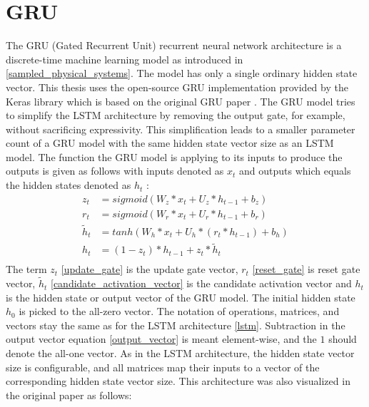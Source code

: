 \documentclass[draft,final]{vutinfth} %
\begin{document}
\section{GRU} \label{gru}
The GRU (Gated Recurrent Unit) recurrent neural network architecture is a discrete-time machine learning model as introduced in \ref{sampled_physical_systems}.
The model has only a single ordinary hidden state vector.
This thesis uses the open-source GRU implementation provided by the Keras library \cite{Keras} which is based on the original GRU paper \cite{GRU}.
The GRU model tries to simplify the LSTM architecture by removing the output gate, for example, without sacrificing expressivity.
This simplification leads to a smaller parameter count of a GRU model with the same hidden state vector size as an LSTM model.
The function the GRU model is applying to its inputs to produce the outputs is given as follows with inputs denoted as $x_t$ and outputs which equals the hidden states denoted as $h_t$ \cite[p. 4]{GRU}:
\begin{align}
\label{update_gate} z_t &= sigmoid(W_z*x_t + U_z*h_{t-1} + b_z) \\
\label{reset_gate} r_t &= sigmoid(W_r*x_t + U_r*h_{t-1} + b_r) \\
\label{candidate_activation_vector} \tilde{h}_t &= tanh(W_h*x_t + U_h*(r_t * h_{t-1}) + b_h) \\
\label{output_vector} h_t &= (1 - z_t) * h_{t-1} + z_t * \tilde{h}_t \\
\end{align}
The term $z_t$ \ref{update_gate} is the update gate vector, $r_t$ \ref{reset_gate} is reset gate vector, $\tilde{h}_t$ \ref{candidate_activation_vector} is the candidate activation vector and $h_t$ is the hidden state or output vector of the GRU model.
The initial hidden state $h_0$ is picked to the all-zero vector.
The notation of operations, matrices, and vectors stay the same as for the LSTM architecture \ref{lstm}.
Subtraction in the output vector equation \ref{output_vector} is meant element-wise, and the $1$ should denote the all-one vector.
As in the LSTM architecture, the hidden state vector size is configurable, and all matrices map their inputs to a vector of the corresponding hidden state vector size.
This architecture was also visualized in the original paper as follows:
\end{document}
